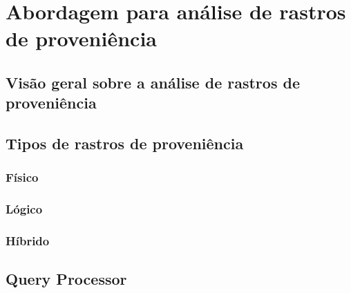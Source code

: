 
\chapter{Abordagem para análise de rastros de proveniência}%
\label{chap:rastros-de-proveniencia}

\section{Visão geral sobre a análise de rastros de proveniência}

\section{Tipos de rastros de proveniência}

\subsection{Físico}

\subsection{Lógico}

\subsection{Híbrido}


\section{Query Processor}




